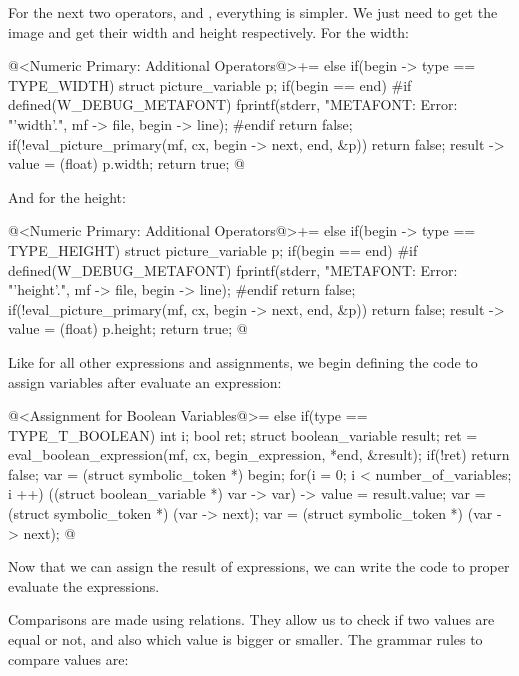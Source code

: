 {{{{{For the next two operators, 
and , everything is simpler. We just need to get
the image and get their width and height respectively. For the width:

\iniciocodigo
@<Numeric Primary: Additional Operators@>+=
else if(begin -> type == TYPE_WIDTH){
  struct picture_variable p;
  if(begin == end){
#if defined(W_DEBUG_METAFONT)
    fprintf(stderr, "METAFONT: Error: %
                    "'width'.\n", mf -> file, begin -> line);
#endif
    return false;
  }
  if(!eval_picture_primary(mf, cx, begin -> next, end, &p))
    return false;
  result -> value = (float) p.width;
  return true;
}
@
\fimcodigo

And for the height:

\iniciocodigo
@<Numeric Primary: Additional Operators@>+=
else if(begin -> type == TYPE_HEIGHT){
  struct picture_variable p;
  if(begin == end){
#if defined(W_DEBUG_METAFONT)
    fprintf(stderr, "METAFONT: Error: %
                    "'height'.\n", mf -> file, begin -> line);
#endif
    return false;
  }
  if(!eval_picture_primary(mf, cx, begin -> next, end, &p))
    return false;
  result -> value = (float) p.height;
  return true;
}
@
\fimcodigo



Like for all other expressions and assignments, we begin defining the
code to assign variables after evaluate an expression:

\iniciocodigo
@<Assignment for Boolean Variables@>=
else if(type == TYPE_T_BOOLEAN){
  int i;
  bool ret;
  struct boolean_variable result;
  ret = eval_boolean_expression(mf, cx, begin_expression, *end, &result);
  if(!ret)
    return false;
  var = (struct symbolic_token *) begin;
  for(i = 0; i < number_of_variables; i ++){
    ((struct boolean_variable *) var -> var) -> value = result.value;
    var = (struct symbolic_token *) (var -> next);
    var = (struct symbolic_token *) (var -> next);
  }
}
@
\fimcodigo

Now that we can assign the result of expressions, we can write the
code to proper evaluate the expressions.


Comparisons are made using relations. They allow us to check if two
values are equal or not, and also which value is bigger or
smaller. The grammar rules to compare values are:

}}}}}
